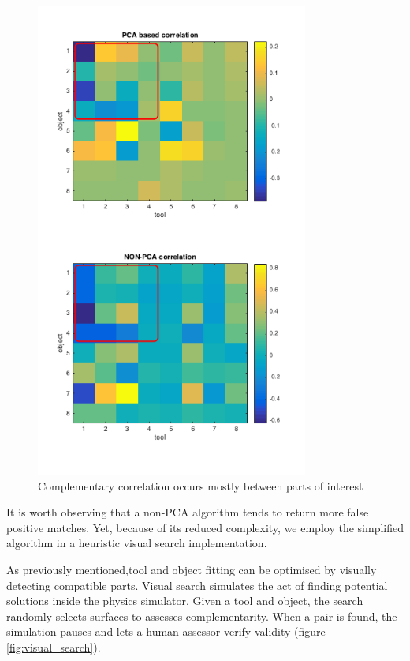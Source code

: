 \documentclass[11]{article}
\begin{document}
\begin{figure}[!h]
  \centering
  \includegraphics[width=0.8\textwidth]{figures/correlation_comparison.png}
  \caption{Complementary correlation occurs mostly between parts of interest}
  \label{fig:correlation_parts}
\end{figure}  

It is worth observing that a non-PCA algorithm tends to return more false positive matches. 
Yet, because of its reduced complexity, we employ the simplified algorithm in a heuristic visual search implementation.

As previously mentioned,tool and object fitting can be optimised by visually detecting compatible parts.  
Visual search simulates the act of finding potential solutions inside the physics simulator.
Given a tool and object, the search randomly selects surfaces to assesses complementarity.
When a pair is found, the simulation pauses and lets a human assessor verify validity (figure \ref{fig:visual_search}). 
\end{document}
